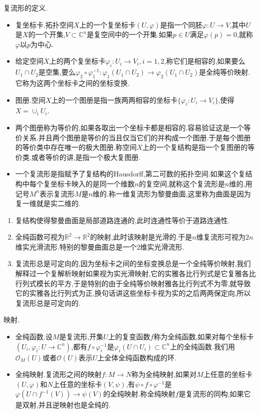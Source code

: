 复流形的定义.
\begin{itemize}
	\item 复坐标卡.拓扑空间$X$上的一个复坐标卡$(U,\varphi)$是指一个同胚$\varphi:U\to V$,其中$U$是$X$的一个开集,$V\subset\mathbb{C}^n$是复空间中的一个开集.如果$p\in U$满足$\varphi(p)=0$,就称$\varphi$以$p$为中心.
	\item 给定空间$X$上的两个复坐标卡$\varphi_i:U_i\to V_i,i=1,2$,称它们是相容的,如果要么$U_1\cap U_2$是空集,要么$\varphi_2\circ\varphi_1^{-1}:\varphi_1(U_1\cap U_2)\to\varphi_2(U_1\cap U_2)$是全纯等价映射.它称为这两个坐标卡之间的坐标变换.
	\item 图册.空间$X$上的一个图册是指一族两两相容的坐标卡$\{\varphi_i:U_i\to V_i\}$,使得$X=\cup_iU_i$.
	\item 两个图册称为等价的,如果各取出一个坐标卡都是相容的.容易验证这是一个等价关系.并且两个图册是等价的当且仅当它们的并构成一个图册.于是每个图册的等价类中存在唯一的极大图册.称空间$X$上的一个复结构是指一个复图册的等价类,或者等价的讲,是指一个极大复图册.
	\item 一个复流形是指赋予了复结构的Hausdorff,第二可数的拓扑空间.如果这个复结构中每个复坐标卡映入的是同一个维数$n$的复空间,就称这个复流形是$n$维的,用记号$M^n$表示复流形$M$是$n$维的.称一维复流形为黎曼曲面,这里称为曲面是因为复一维就是实二维的.
\end{itemize}
\begin{enumerate}
	\item 复结构使得黎曼曲面是局部道路连通的,此时连通性等价于道路连通性.
	\item 全纯函数可视为$\mathbb{R}^2\to\mathbb{R}^2$的映射,此时该映射是光滑的.于是$n$维复流形可视为$2n$维实光滑流形.特别的黎曼曲面总是一个2维实光滑流形.
	\item 复流形总是可定向的,因为坐标卡之间的坐标变换总是一个全纯等价映射,我们解释过一个复解析映射如果视为实光滑映射,它的实雅各比行列式是它复雅各比行列式模长的平方,于是特别的由于全纯等价映射雅各比行列式不为零,就导致它的实雅各比行列式为正,换句话讲这些坐标卡视为实的之后两两保定向,所以复流形总是可定向的.
\end{enumerate}

映射.
\begin{itemize}
	\item 全纯函数.设$M$是复流形,开集$U$上的复变函数$f$称为全纯函数,如果对每个坐标卡$(U_i,\varphi_i:U\to\mathbb{C}^n)$,都有$f\circ\varphi_i^{-1}$是$\varphi_i(U\cap U_i)\subset\mathbb{C}^n$上的全纯函数.我们用$\mathscr{O}_M(U)$或者$\mathscr{O}(U)$表示$U$上全体全纯函数构成的环.
	\item 全纯映射.复流形之间的映射$f:M\to N$称为全纯映射,如果对$M$上任意的坐标卡$(U,\varphi)$和$N$上任意的坐标卡$(V,\psi)$,有$\psi\circ f\circ\varphi^{-1}$是$\varphi(U\cap f^{-1}(V))\to\psi(V)$的全纯映射.称全纯映射$f$是复流形的同构,如果它是双射,并且逆映射也是全纯的.
\end{itemize}

